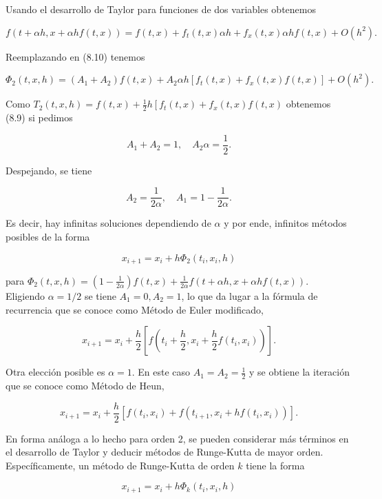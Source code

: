 \documentclass[10pt]{article}
\begin{document}
Usando el desarrollo de Taylor para funciones de dos variables obtenemos

$$
f(t+\alpha h, x+\alpha h f(t, x))=f(t, x)+f_{t}(t, x) \alpha h+f_{x}(t, x) \alpha h f(t, x)+O\left(h^{2}\right) .
$$

Reemplazando en (8.10) tenemos

$$
\Phi_{2}(t, x, h)=\left(A_{1}+A_{2}\right) f(t, x)+A_{2} \alpha h\left[f_{t}(t, x)+f_{x}(t, x) f(t, x)\right]+O\left(h^{2}\right) .
$$

Como $T_{2}(t, x, h)=f(t, x)+\frac{1}{2} h\left[f_{t}(t, x)+f_{x}(t, x) f(t, x)\right.$ obtenemos (8.9) si pedimos

$$
A_{1}+A_{2}=1, \quad A_{2} \alpha=\frac{1}{2} .
$$

Despejando, se tiene

$$
A_{2}=\frac{1}{2 \alpha}, \quad A_{1}=1-\frac{1}{2 \alpha} .
$$

Es decir, hay infinitas soluciones dependiendo de $\alpha$ y por ende, infinitos métodos posibles de la forma

$$
x_{i+1}=x_{i}+h \Phi_{2}\left(t_{i}, x_{i}, h\right)
$$

para $\Phi_{2}(t, x, h)=\left(1-\frac{1}{2 \alpha}\right) f(t, x)+\frac{1}{2 \alpha} f(t+\alpha h, x+\alpha h f(t, x))$.\\
Eligiendo $\alpha=1 / 2$ se tiene $A_{1}=0, A_{2}=1$, lo que da lugar a la fórmula de recurrencia que se conoce como Método de Euler modificado,


\begin{equation*}
x_{i+1}=x_{i}+\frac{h}{2}\left[f\left(t_{i}+\frac{h}{2}, x_{i}+\frac{h}{2} f\left(t_{i}, x_{i}\right)\right)\right] . \tag{8.11}
\end{equation*}


Otra elección posible es $\alpha=1$. En este caso $A_{1}=A_{2}=\frac{1}{2}$ y se obtiene la iteración que se conoce como Método de Heun,


\begin{equation*}
x_{i+1}=x_{i}+\frac{h}{2}\left[f\left(t_{i}, x_{i}\right)+f\left(t_{i+1}, x_{i}+h f\left(t_{i}, x_{i}\right)\right)\right] . \tag{8.12}
\end{equation*}


En forma análoga a lo hecho para orden 2, se pueden considerar más términos en el desarrollo de Taylor y deducir métodos de Runge-Kutta de mayor orden. Específicamente, un método de Runge-Kutta de orden $k$ tiene la forma

$$
x_{i+1}=x_{i}+h \Phi_{k}\left(t_{i}, x_{i}, h\right)
$$
\end{document}
